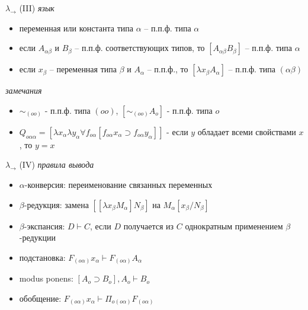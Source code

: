 \documentclass{beamer}
\begin{document}
\begin{frame}{$\lambda_\to$ (III)}
\textit{язык}\\
\medskip
\begin{itemize}
  \item переменная или константа типа $\alpha$ -- п.п.ф. типа $\alpha$ 
  \item если $A_{\alpha\beta}$ и $B_{\beta}$ -- п.п.ф. соответствующих типов, то $[A_{\alpha\beta}B_\beta]$ -- п.п.ф. типа $\alpha$
  \item если $x_\beta$ -- переменная типа $\beta$ и $A_\alpha$ -- п.п.ф., то $[\lambda x_\beta A_\alpha]$ -- п.п.ф. типа $(\alpha \beta)$
\end{itemize}
\bigskip
\textit{замечания}\\
\begin{itemize}
  \item $\sim_{(oo)}$ - п.п.ф. типа $(oo)$, $[\sim_{(oo)}A_o]$ - п.п.ф. типа $o$
  \item $Q_{o \alpha \alpha} = [\lambda x_\alpha \lambda y_\alpha \forall f_{o \alpha}[f_{o \alpha} x_\alpha \supset f_{o \alpha} y_\alpha]]$ - если $y$ обладает всеми свойствами $x$, то $y = x$
\end{itemize}
\end{frame}

\begin{frame}{$\lambda_\to$ (IV)}
\textit{правила вывода}\\
\bigskip
\begin{itemize}
  \item $\alpha$-конверсия: переименование связанных переменных
  \item $\beta$-редукция: замена $[[\lambda x_\beta M_\alpha] N_\beta]$ на $M_\alpha[x_\beta/N_\beta]$
  \item $\beta$-экспансия: $D \vdash C$, если $D$ получается из $C$ однократным применением $\beta$-редукции
  \item подстановка: $F_{(o \alpha)} x_\alpha \vdash F_{(o \alpha)} A_\alpha$
  \item modus ponens: $[A_o \supset B_o], A_o \vdash B_o$ 
  \item обобщение: $F_{(o \alpha)} x_\alpha \vdash \Pi_{o (o \alpha)} F_{(o \alpha)}$
\end{itemize}
\end{frame}
\end{document}
